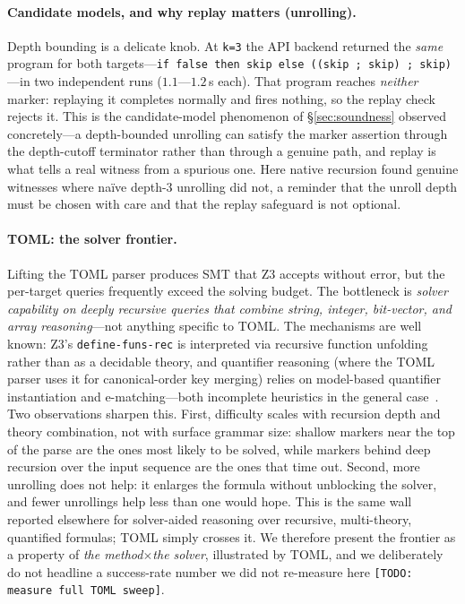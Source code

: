 \documentclass[11pt,a4paper]{article}
\theoremstyle{definition}
\theoremstyle{remark}
\newcommand{\toml}{TOML}
\newcommand{\code}[1]{\texttt{#1}}
\begin{document}
\paragraph{Candidate models, and why replay matters (unrolling).}
Depth bounding is a delicate knob. At \code{k=3} the API backend returned the
\emph{same} program for both targets---\code{if false then skip else ((skip ;
skip) ; skip)}---in two independent runs ($1.1$---$1.2$\,s each). That program
reaches \emph{neither} marker: replaying it completes normally and fires nothing,
so the replay check rejects it. This is the candidate-model phenomenon of
\S\ref{sec:soundness} observed concretely---a depth-bounded unrolling can satisfy
the marker assertion through the depth-cutoff terminator rather than through a
genuine path, and replay is what tells a real witness from a spurious one. Here
native recursion found genuine witnesses where na\"ive depth-3 unrolling did not,
a reminder that the unroll depth must be chosen with care and that the replay
safeguard is not optional.

\paragraph{\toml{}: the solver frontier.}
Lifting the \toml{} parser produces SMT that Z3 accepts without error, but the
per-target queries frequently exceed the solving budget. The bottleneck is
\emph{solver capability on deeply recursive queries that combine string, integer,
bit-vector, and array reasoning}---not anything specific to \toml{}. The
mechanisms are well known: Z3's \code{define-funs-rec} is interpreted via
recursive function unfolding rather than as a decidable theory, and quantifier
reasoning (where the \toml{} parser uses it for canonical-order key merging)
relies on model-based quantifier instantiation and e-matching---both incomplete
heuristics in the general case~\cite{demoura2008z3,barrett2017smtlib}. Two
observations sharpen this. First, difficulty scales with recursion depth and
theory combination, not with surface grammar size: shallow markers near the top
of the parse are the ones most likely to be solved, while markers behind deep
recursion over the input sequence are the ones that time out. Second, more
unrolling does not help: it enlarges the formula without unblocking the solver,
and fewer unrollings help less than one would hope. This is the same wall
reported elsewhere for solver-aided reasoning over recursive, multi-theory,
quantified formulas; \toml{} simply crosses it. We therefore present the
frontier as a property of \emph{the method$\times$the solver}, illustrated by
\toml{}, and we deliberately do not headline a success-rate number we did not
re-measure here \code{[TODO: measure full \toml{} sweep]}.
\end{document}
